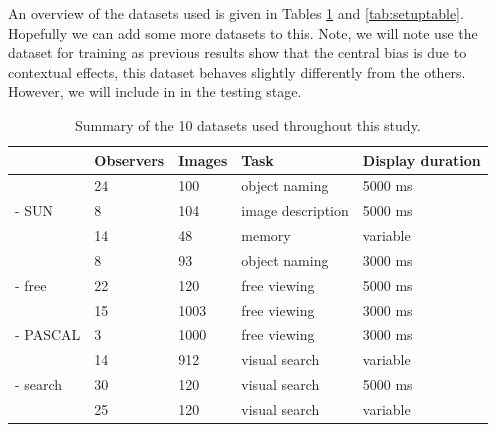 \documentclass[a4paper, onecolumn, oneside, 11pt]{article}
\begin{document}
An overview of the datasets used is given in Tables \ref{tab:datasets} and \ref{tab:setuptable}. Hopefully we can add some more datasets to this. Note, we will note use the \cite{ehinger2009} dataset for training as previous results show that the central bias is due to contextual effects, this dataset behaves slightly differently from the others. However, we will include in in the testing stage. 


\begin{table}
\centering
\small
\begin{tabular}{l|llll}
 & Observers & Images &  Task & Display duration\\
\hline
\cite{clarke2013}     & 24    & 100   & object naming        & 5000 ms\\
\cite{yun2013} - SUN        & 8     & 104   & image description    & 5000 ms\\
\cite{tatler2005}     & 14    & 48     & memory & variable\\
\cite{einhauser2008} & 8    & 93      & object naming & 3000 ms \\
\hline
\cite{tatler2007} - free    & 22    & 120   & free viewing          & 5000 ms\\
\cite{judd2009}         & 15 & 1003      & free viewing & 3000 ms\\
\cite{yun2013} - PASCAL        & 3 & 1000  & free viewing & 3000 ms\\
\hline
\cite{ehinger2009}     & 14 & 912 &  visual search & variable\\
\cite{tatler2007} - search    & 30 & 120 &   visual search & 5000 ms\\
\cite{asher2013}    & 25    & 120      & visual search & variable\\
\end{tabular}

\caption{Summary of the 10 datasets used throughout this study.}
\label{tab:datasets}
\end{table}
\end{document}
